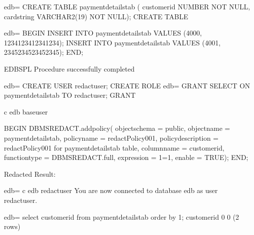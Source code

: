 \documentclass[letterpaper,10pt,english,openany,oneside]{sphinxmanual}
\begin{document}
%
\begin{sphinxVerbatim}[commandchars=\\\{\}]
edb=\PYGZsh{} CREATE TABLE payment\PYGZus{}details\PYGZus{}tab (
customer\PYGZus{}id NUMBER       NOT NULL,
card\PYGZus{}string VARCHAR2(19) NOT NULL);
CREATE TABLE

edb=\PYGZsh{} BEGIN
  INSERT INTO payment\PYGZus{}details\PYGZus{}tab VALUES (4000, \PYGZsq{}1234\PYGZhy{}1234\PYGZhy{}1234\PYGZhy{}1234\PYGZsq{});
  INSERT INTO payment\PYGZus{}details\PYGZus{}tab VALUES (4001, \PYGZsq{}2345\PYGZhy{}2345\PYGZhy{}2345\PYGZhy{}2345\PYGZsq{});
END;

EDB\PYGZhy{}SPL Procedure successfully completed

edb=\PYGZsh{} CREATE USER redact\PYGZus{}user;
CREATE ROLE
edb=\PYGZsh{} GRANT SELECT ON payment\PYGZus{}details\PYGZus{}tab TO redact\PYGZus{}user;
GRANT

\PYGZbs{}c edb base\PYGZus{}user

BEGIN
  DBMS\PYGZus{}REDACT.add\PYGZus{}policy(
    object\PYGZus{}schema              =\PYGZgt{} \PYGZsq{}public\PYGZsq{},
    object\PYGZus{}name                =\PYGZgt{} \PYGZsq{}payment\PYGZus{}details\PYGZus{}tab\PYGZsq{},
    policy\PYGZus{}name                =\PYGZgt{} \PYGZsq{}redactPolicy\PYGZus{}001\PYGZsq{},
    policy\PYGZus{}description         =\PYGZgt{} \PYGZsq{}redactPolicy\PYGZus{}001 for payment\PYGZus{}details\PYGZus{}tab table\PYGZsq{},
    column\PYGZus{}name                =\PYGZgt{} \PYGZsq{}customer\PYGZus{}id\PYGZsq{},
    function\PYGZus{}type          =\PYGZgt{} DBMS\PYGZus{}REDACT.full,
    expression                 =\PYGZgt{} \PYGZsq{}1=1\PYGZsq{},
    enable                     =\PYGZgt{} TRUE);
END;
\end{sphinxVerbatim}

Redacted Result:

%
\begin{sphinxVerbatim}[commandchars=\\\{\}]
edb=\PYGZsh{} \PYGZbs{}c edb redact\PYGZus{}user
You are now connected to database \PYGZdq{}edb\PYGZdq{} as user \PYGZdq{}redact\PYGZus{}user\PYGZdq{}.

edb=\PYGZgt{} select customer\PYGZus{}id from payment\PYGZus{}details\PYGZus{}tab order by 1;
 customer\PYGZus{}id
\PYGZhy{}\PYGZhy{}\PYGZhy{}\PYGZhy{}\PYGZhy{}\PYGZhy{}\PYGZhy{}\PYGZhy{}\PYGZhy{}\PYGZhy{}\PYGZhy{}\PYGZhy{}\PYGZhy{}
           0
           0
(2 rows)
\end{sphinxVerbatim}
\end{document}
